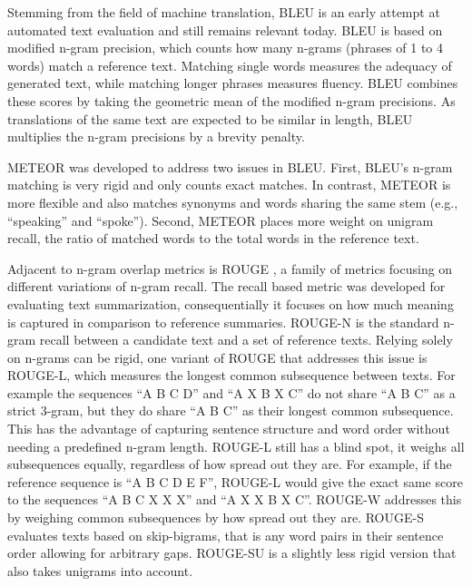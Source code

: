 Stemming from the field of machine translation, BLEU \cite{papineniBleuMethodAutomatic2002} is an early attempt at automated text evaluation and still remains relevant today. BLEU is based on modified n-gram precision, which counts how many n-grams (phrases of 1 to 4 words) match a reference text. Matching single words measures the adequacy of generated text, while matching longer phrases measures fluency. BLEU combines these scores by taking the geometric mean of the modified n-gram precisions. As translations of the same text are expected to be similar in length, BLEU multiplies the n-gram precisions by a brevity penalty.

METEOR \cite{banerjeeMETEORAutomaticMetric2005} was developed to address two issues in BLEU. First, BLEU's n-gram matching is very rigid and only counts exact matches. In contrast, METEOR is more flexible and also matches synonyms and words sharing the same stem (e.g., ``speaking'' and ``spoke''). Second, METEOR places more weight on unigram recall, the ratio of matched words to the total words in the reference text.


Adjacent to n-gram overlap metrics is ROUGE \cite{linROUGEPackageAutomatic2004}, a family of metrics focusing on different variations of n-gram recall. The recall based metric was developed for evaluating text summarization, consequentially it focuses on how much meaning is captured in comparison to reference summaries. ROUGE-N is the standard n-gram recall between a candidate text and a set of reference texts. Relying solely on n-grams can be rigid, one variant of ROUGE that addresses this issue is ROUGE-L, which measures the longest common subsequence between texts. For example the sequences ``A B C D'' and ``A X B X C'' do not share ``A B C'' as a strict 3-gram, but they do share ``A B C'' as their longest common subsequence. This has the advantage of capturing sentence structure and word order without needing a predefined n-gram length. ROUGE-L still has a blind spot, it weighs all subsequences equally, regardless of how spread out they are. For example, if the reference sequence is ``A B C D E F'', ROUGE-L would give the exact same score to the sequences ``A B C X X X'' and ``A X X B X C''. ROUGE-W addresses this by weighing common subsequences by how spread out they are. ROUGE-S evaluates texts based on skip-bigrams, that is any word pairs in their sentence order allowing for arbitrary gaps. ROUGE-SU is a slightly less rigid version that also takes unigrams into account.

